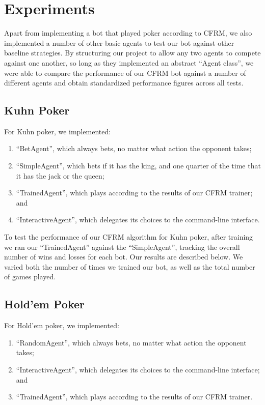 \documentclass[11pt]{article}
\begin{document}
\section{Experiments}

Apart from implementing a bot that played poker according to CFRM, we also implemented a number of other basic agents to test our bot against other baseline strategies. By structuring our project to allow any two agents to compete against one another, so long as they implemented an abstract ``Agent class'', we were able to compare the performance of our CFRM bot against a number of different agents and obtain standardized performance figures across all tests.

\subsection{Kuhn Poker}

For Kuhn poker, we implemented:

\begin{enumerate}
\item ``BetAgent'', which always bets, no matter what action the opponent takes;
\item ``SimpleAgent'', which bets if it has the king, and one quarter of the time that it has the jack or the queen;
\item ``TrainedAgent'', which plays according to the results of our CFRM trainer; and
\item ``InteractiveAgent'', which delegates its choices to the command-line interface.
\end{enumerate}

To test the performance of our CFRM algorithm for Kuhn poker, after training we ran our ``TrainedAgent'' against the ``SimpleAgent'', tracking the overall number of wins and losses for each bot. Our results are described below. We varied both the number of times we trained our bot, as well as the total number of games played.

\subsection{Hold'em Poker}

For Hold'em poker, we implemented:

\begin{enumerate}
\item ``RandomAgent'', which always bets, no matter what action the opponent takes;
\item ``InteractiveAgent'', which delegates its choices to the command-line interface; and
\item ``TrainedAgent'', which plays according to the results of our CFRM trainer.
\end{enumerate}
\end{document}
